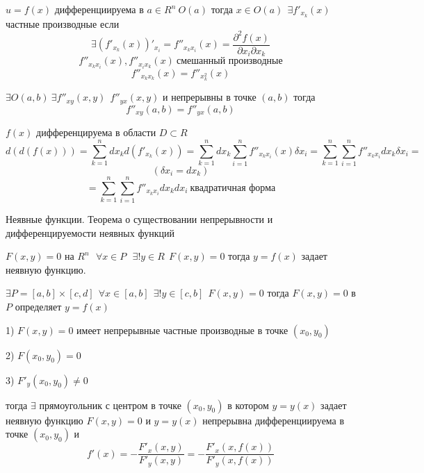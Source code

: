 \begin{define}
  $u = f(x)$ дифференциируема в $a \in R^n ~ O(a)$ тогда $x \in O(a) ~~
  \exists f'_{x_k}(x)$ частные производные если
  $$
  \exists (f'_{x_k}(x))'_{x_i} = f''_{x_k x_i}(x) = \frac{\partial^2 f(x)}
  {\partial x_i \partial x_k}
  $$
  $$
  f''_{x_k x_i}(x), f''_{x_i x_k}(x) ~ \text{смешанный производные}
  $$
  $$
  f''_{x_k x_k}(x) = f''_{x_k^2}(x)
  $$
\end{define}

\begin{theorem}
  $\exists O(a,b) ~ \exists f''_{xy}(x,y) ~~ f''_{yx}(x,y)$ и
  непрерывны в точке $(a,b)$ тогда
  $$
  f''_{xy}(a,b) = f''_{yx}(a,b)
  $$
\end{theorem}

\begin{define}
  $f(x)$ дифференцируема в области $D \subset R$
  $$
  d(d(f(x))) = \sum_{k=1}^n dx_k d(f'_{x_k}(x)) = \sum_{k=1}^n dx_k
  \sum_{i=1}^n f''_{x_k x_i}(x) \delta x_i = \sum_{k=1}^n \sum_{i=1}^n
  f''_{x_k x_i} dx_k \delta x_i =
  $$
  $$
  (\delta x_i = d x_k)
  $$
  $$
  = \sum_{k=1}^n \sum_{i=1}^n f''_{x_k x_i} dx_k dx_i ~
  \text{квадратичная форма}
  $$
\end{define}

\begin{title}[\Large]
  Неявные функции. Теорема о существовании непрерывности и дифференцируемости
  неявных функций
\end{title}

\begin{define}
  $F(x, y) = 0$ на $R^n ~~~ \forall x \in P ~~~ \exists! y \in R ~~
  F(x, y) = 0$ тогда $y = f(x)$ задает неявную функцию.

  $\exists P = [a,b] \times [c,d] ~~ \forall x \in [a,b] ~~
  \exists! y \in [c,b] ~~ F(x,y) = 0$ тогда
  $F(x,y) = 0$ в $P$ определяет $y = f(x)$
\end{define}

\begin{theorem}
  1) $F(x, y) = 0$ имеет непрерывные частные производные в точке $(x_0, y_0)$

  2) $F(x_0, y_0) = 0$

  3) $F'_y(x_0, y_0) \not= 0$

  тогда $\exists$ прямоугольник с центром в точке $(x_0, y_0)$ в котором
  $y = y(x)$ задает неявную функцию $F(x,y)=0$ и $y = y(x)$
  непрерывна дифференциируема в точке $(x_0, y_0)$ и
  $$
  f'(x) = - \frac{F'_x(x, y)}{F'_y(x, y)} = -
  \frac{F'_x(x, f(x))}{F'_y(x, f(x))}
  $$
\end{theorem}

